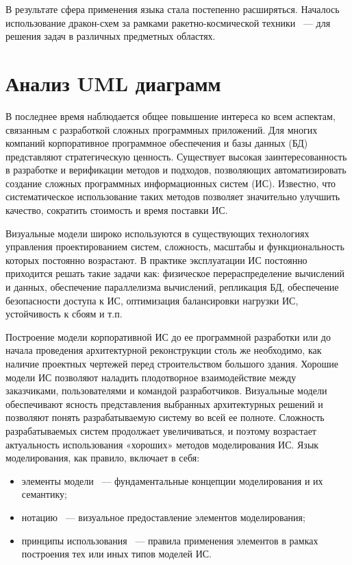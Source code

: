 В результате сфера применения языка стала постепенно расширяться. Началось использование дракон-схем за рамками ракетно-космической техники ~--- для решения задач в различных предметных областях.

\section{Анализ UML диаграмм}

В последнее время наблюдается общее повышение интереса ко всем аспектам, связанным с разработкой сложных программных приложений. Для многих компаний корпоративное программное обеспечения и базы данных (БД) представляют стратегическую ценность. Существует высокая заинтересованность в разработке и верификации методов и подходов, позволяющих автоматизировать создание сложных программных информационных систем (ИС). Известно, что систематическое использование таких методов позволяет значительно улучшить качество, сократить стоимость и время поставки ИС.

Визуальные модели широко используются в существующих технологиях управления проектированием систем, сложность, масштабы и функциональность которых постоянно возрастают. В практике эксплуатации ИС постоянно приходится решать такие задачи как: физическое перераспределение вычислений и данных, обеспечение параллелизма вычислений, репликация БД, обеспечение безопасности доступа к ИС, оптимизация балансировки нагрузки ИС, устойчивость к сбоям и т.п.

Построение модели корпоративной ИС до ее программной разработки или до начала проведения архитектурной реконструкции столь же необходимо, как наличие проектных чертежей перед строительством большого здания. Хорошие модели ИС позволяют наладить плодотворное взаимодействие между заказчиками, пользователями и командой разработчиков. Визуальные модели обеспечивают ясность представления выбранных архитектурных решений и позволяют понять разрабатываемую систему во всей ее полноте. Сложность разрабатываемых систем продолжает увеличиваться, и поэтому возрастает актуальность использования «хороших» методов моделирования ИС. Язык моделирования, как правило, включает в себя:
\begin{itemize}
\item элементы модели ~--- фундаментальные концепции моделирования и их семантику;
\item нотацию ~--- визуальное предоставление элементов моделирования;
\item принципы использования ~--- правила применения элементов в рамках построения тех или иных типов моделей ИС.
\end{itemize}

